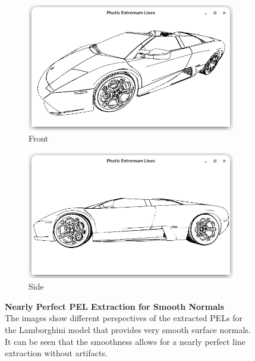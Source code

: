 \documentclass[9pt,fleqn,twoside,twocolumn]{stdglobal}
\begin{document}
    \begin{figure}[t]
      \centering
      \begin{subfigure}[b]{\linewidth}
        \centering
        \includegraphics[width=\textwidth,trim={15px 15 15 50},clip]{images/lamborghini-front.png}
        \caption{Front}
      \end{subfigure}
      \begin{subfigure}[b]{\linewidth}
        \centering
        \includegraphics[width=\textwidth,trim={15px 15 15 50},clip]{images/lamborghini-side.png}
        \caption{Side}
      \end{subfigure}
      \caption{%
        \textbf{Nearly Perfect PEL Extraction for Smooth Normals}\\
        The images show different perspectives of the extracted PELs for the Lamborghini model that provides very smooth surface normals.
        It can be seen that the smoothness allows for a nearly perfect line extraction without artifacts.
      }
      \label{fig:preprocessing-normals-smooth}
    \end{figure}
\end{document}
